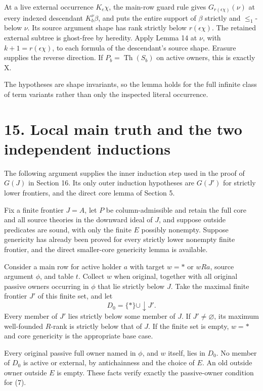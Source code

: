 \documentclass[
  11pt,
  letterpaper,
]{article}
\newcounter{none} %
\begin{document}
At a live external occurrence \(K_e\chi\), the main-row guard rule gives
\(G_{r(\epsilon\chi)}(\nu)\) at every indexed descendant
\(K_b^\nu\beta\), and puts the entire support of \(\beta\) strictly and
\(\leq_1\)-below \(\nu\). Its source argument shape has rank strictly
below \(r(\epsilon\chi)\). The retained external subtree is ghost-free
by heredity. Apply Lemma 14 at \(\nu\), with \(k+1=r(\epsilon\chi)\), to
each formula of the descendant's source shape. Erasure supplies the
reverse direction. If \(P_b=\operatorname{Th}(S_b)\) on active owners,
this is exactly X.

The hypotheses are shape invariants, so the lemma holds for the full
infinite class of term variants rather than only the inspected literal
occurrence.

\section{15. Local main truth and the two independent
inductions}\label{local-main-truth-and-the-two-independent-inductions}

The following argument supplies the inner induction step used in the
proof of \(G(J)\) in Section 16. Its only outer induction hypotheses are
\(G(J')\) for strictly lower frontiers, and the direct core lemma of
Section 5.

Fix a finite frontier \(J=A\), let \(P\) be column-admissible and retain
the full core and all source theories in the downward ideal of \(J\),
and suppose outside predicates are sound, with only the finite \(E\)
possibly nonempty. Suppose genericity has already been proved for every
strictly lower nonempty finite frontier, and the direct smaller-core
genericity lemma is available.

Consider a main row for active holder \(a\) with target \(w=*\) or
\(wRa\), source argument \(\phi\), and table \(t\). Collect \(w\) when
original, together with all original passive owners occurring in
\(\phi\) that lie strictly below \(J\). Take the maximal finite frontier
\(J'\) of this finite set, and let \[
D_0=\{*\}\cup\downarrow J'.
\] Every member of \(J'\) lies strictly below some member of \(J\). If
\(J'\ne\varnothing\), its maximum well-founded \(R\)-rank is strictly
below that of \(J\). If the finite set is empty, \(w=*\) and core
genericity is the appropriate base case.

Every original passive full owner named in \(\phi\), and \(w\) itself,
lies in \(D_0\). No member of \(D_0\) is active or external, by
antichainness and the choice of \(E\). An old outside owner outside
\(E\) is empty. These facts verify exactly the passive-owner condition
for (7).
\end{document}
